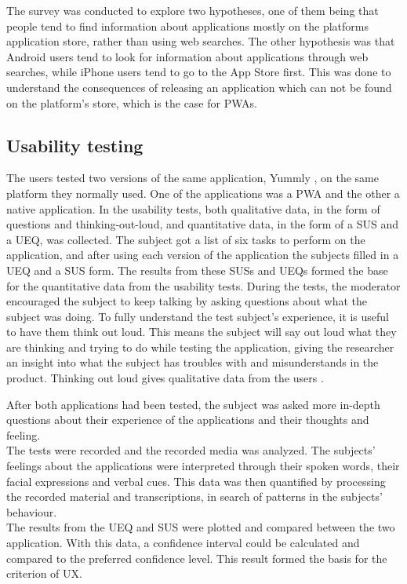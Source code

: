 The survey was conducted to explore two hypotheses, one of them being that people tend to find information about applications mostly on the platforms application store, rather than using web searches. The other hypothesis was that Android users tend to look for information about applications through web searches, while iPhone users tend to go to the App Store first. This was done to understand the consequences of releasing an application which can not be found on the platform’s store, which is the case for PWAs. 

\subsection{Usability testing}

The users tested two versions of the same application, Yummly \cite{Yummly}, on the same platform they normally used. One of the applications was a PWA and the other a native application. In the usability tests, both qualitative data, in the form of questions and thinking-out-loud, and quantitative data, in the form of a SUS and a UEQ, was collected. 
\newline
The subject got a list of six tasks to perform on the application, and after using each version of the application the subjects filled in a UEQ and a SUS form. The results from these SUSs and UEQs formed the base for the quantitative data from the usability tests. During the tests, the moderator encouraged the subject to keep talking by asking questions about what the subject was doing. To fully understand the test subject’s experience, it is useful to have them think out loud. This means the subject will say out loud what they are thinking and trying to do while testing the application, giving the researcher an insight into what the subject has troubles with and misunderstands in the product. Thinking out loud gives qualitative data from the users \cite{Nielsen2012}.


After both applications had been tested, the subject was asked more in-depth questions about their experience of the applications and their thoughts and feeling. \\
The tests were recorded and the recorded media was analyzed. The subjects’ feelings about the applications were interpreted through their spoken words, their facial expressions and verbal cues. This data was then quantified by processing the recorded material and transcriptions, in search of patterns in the subjects’ behaviour. \\
The results from the UEQ and SUS were plotted and compared between the two application. With this data, a confidence interval could be calculated and compared to the preferred confidence level. This result formed the basis for the criterion of UX.

